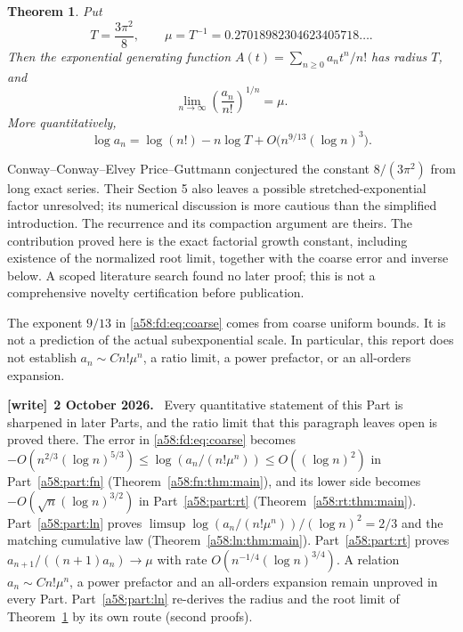 \documentclass[11pt,letterpaper]{article}
\newtheorem{theorem}{Theorem}[section]
\theoremstyle{remark}
\newenvironment{writenote}[1][]{\par\smallskip\begingroup\small
 \noindent\textbf{[write]}\if\relax\detokenize{#1}\relax\else~\textbf{#1.}\fi\ }%
 {\par\endgroup\smallskip}
\begin{document}
\begin{theorem}\label{a58:fd:thm:main}
Put
\[
 T=\frac{3\pi^2}{8},\qquad \mu=T^{-1}=0.27018982304623405718\ldots.
\]
Then the exponential generating function $A(t)=\sum_{n\ge0}a_nt^n/n!$ has radius $T$, and
\begin{equation}\label{a58:fd:eq:limit}
 \lim_{n\to\infty}\left(\frac{a_n}{n!}\right)^{1/n}=\mu.
\end{equation}
More quantitatively,
\begin{equation}\label{a58:fd:eq:coarse}
 \log a_n=\log(n!)-n\log T+O\bigl(n^{9/13}(\log n)^3\bigr).
\end{equation}
\end{theorem}

Conway--Conway--Elvey Price--Guttmann \cite{CCEG} conjectured the constant $8/(3\pi^2)$ from long exact series. Their Section 5 also leaves a possible stretched-exponential factor unresolved; its numerical discussion is more cautious than the simplified introduction. The recurrence and its compaction argument are theirs. The contribution proved here is the exact factorial growth constant, including existence of the normalized root limit, together with the coarse error and inverse below. A scoped literature search found no later proof; this is not a comprehensive novelty certification before publication.

The exponent $9/13$ in \eqref{a58:fd:eq:coarse} comes from coarse uniform bounds. It is not a prediction of the actual subexponential scale. In particular, this report does not establish $a_n\sim Cn!\mu^n$, a ratio limit, a power prefactor, or an all-orders expansion.

\begin{writenote}[2 October 2026]
Every quantitative statement of this Part is sharpened in later Parts, and the ratio limit that this paragraph leaves open is proved there. The error in \eqref{a58:fd:eq:coarse} becomes $-O(n^{2/3}(\log n)^{5/3})\le\log(a_n/(n!\mu^n))\le O((\log n)^2)$ in Part~\ref{a58:part:fn} (Theorem~\ref{a58:fn:thm:main}), and its lower side becomes $-O(\sqrt n(\log n)^{3/2})$ in Part~\ref{a58:part:rt} (Theorem~\ref{a58:rt:thm:main}). Part~\ref{a58:part:ln} proves $\limsup\log(a_n/(n!\mu^n))/(\log n)^2=2/3$ and the matching cumulative law (Theorem~\ref{a58:ln:thm:main}). Part~\ref{a58:part:rt} proves $a_{n+1}/((n+1)a_n)\to\mu$ with rate $O(n^{-1/4}(\log n)^{3/4})$. A relation $a_n\sim Cn!\mu^n$, a power prefactor and an all-orders expansion remain unproved in every Part. Part~\ref{a58:part:ln} re-derives the radius and the root limit of Theorem~\ref{a58:fd:thm:main} by its own route (second proofs).
\end{writenote}
\end{document}
